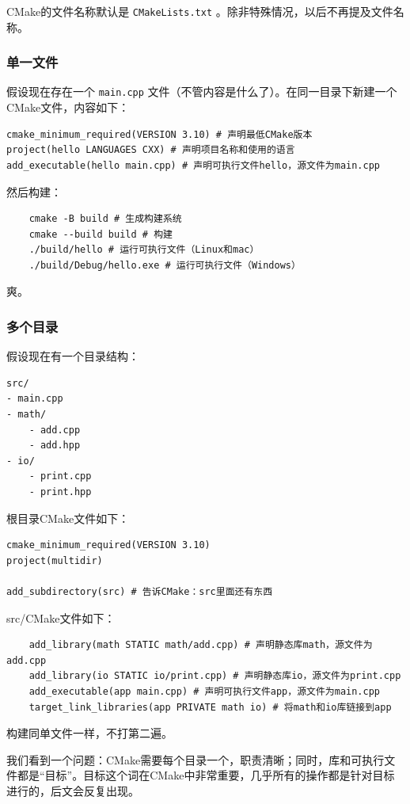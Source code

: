 CMake的文件名称默认是 \texttt{CMakeLists.txt} 。除非特殊情况，以后不再提及文件名称。

\subsubsection{单一文件}

假设现在存在一个 \texttt{main.cpp} 文件（不管内容是什么了）。在同一目录下新建一个CMake文件，内容如下：

\begin{verbatim}
cmake_minimum_required(VERSION 3.10) # 声明最低CMake版本
project(hello LANGUAGES CXX) # 声明项目名称和使用的语言
add_executable(hello main.cpp) # 声明可执行文件hello，源文件为main.cpp
\end{verbatim}

然后构建：
\begin{verbatim}
    cmake -B build # 生成构建系统
    cmake --build build # 构建
    ./build/hello # 运行可执行文件（Linux和mac）
    ./build/Debug/hello.exe # 运行可执行文件（Windows）
\end{verbatim}

爽。

\subsubsection{多个目录}

假设现在有一个目录结构：
\begin{verbatim}
src/
- main.cpp
- math/
    - add.cpp
    - add.hpp
- io/
    - print.cpp
    - print.hpp
\end{verbatim}

根目录CMake文件如下：
\begin{verbatim}
cmake_minimum_required(VERSION 3.10)
project(multidir)

add_subdirectory(src) # 告诉CMake：src里面还有东西
\end{verbatim}

src/CMake文件如下：
\begin{verbatim}
    add_library(math STATIC math/add.cpp) # 声明静态库math，源文件为add.cpp
    add_library(io STATIC io/print.cpp) # 声明静态库io，源文件为print.cpp
    add_executable(app main.cpp) # 声明可执行文件app，源文件为main.cpp
    target_link_libraries(app PRIVATE math io) # 将math和io库链接到app
\end{verbatim}

构建同单文件一样，不打第二遍。

我们看到一个问题：CMake需要每个目录一个，职责清晰；同时，库和可执行文件都是“目标”。目标这个词在CMake中非常重要，几乎所有的操作都是针对目标进行的，后文会反复出现。

